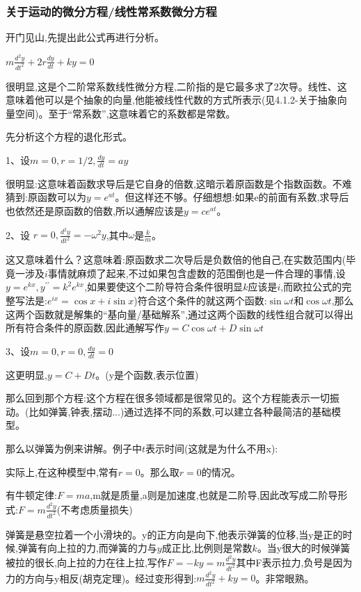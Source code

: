 \documentclass[UTF8]{ctexbook}
\newcommand{\doubleDerivative}{^{\prime\prime}}
\begin{document}
{{{{}%

\subsubsection{关于运动的微分方程/线性常系数微分方程}{
开门见山,先提出此公式再进行分析。

$m\frac{d^2y}{dt^2} + 2r\frac{dy}{dt} + ky = 0$

很明显,这是个二阶常系数线性微分方程,二阶指的是它最多求了2次导。线性、这意味着他可以是个抽象的向量,他能被线性代数的方式所表示(见4.1.2-关于抽象向量空间)。至于“常系数”,这意味着它的系数都是常数。

先分析这个方程的退化形式。

1、设$m = 0, r = 1/2, \frac{dy}{dt} = ay$

很明显:这意味着函数求导后是它自身的倍数,这暗示着原函数是个指数函数。不难猜到:原函数可以为$y = e^{at}$。但这样还不够。仔细想想:如果e的前面有系数,求导后也依然还是原函数的倍数,所以通解应该是$y = ce^{at}$。

2、设 $r = 0, \frac{d^2y}{dt^2} = -\omega^2y$,其中$\omega$是$\frac{k}{m}$。

这又意味着什么？这意味着:原函数求二次导后是负数倍的他自己,在实数范围内(毕竟一涉及$i$事情就麻烦了起来,不过如果包含虚数的范围倒也是一件合理的事情,设$y=e^{kx},y\doubleDerivative = k^{2}e^{kx}$,如果要使这个二阶导符合条件很明显$k$应该是$i$,而欧拉公式的完整写法是:$e^{ix} = \cos x + i\sin x$)符合这个条件的就这两个函数:$\sin\omega t$和$\cos\omega t$,那么这两个函数就是解集的“基向量/基础解系”,通过这两个函数的线性组合就可以得出所有符合条件的原函数,因此通解写作$y = C\cos\omega t + D\sin\omega t$

3、设$m = 0, r = 0, \frac{dy}{dt} = 0$

这更明显,$y = C + Dt$。(y是个函数,表示位置)

那么回到那个方程:这个方程在很多领域都是很常见的。这个方程能表示一切振动。(比如弹簧,钟表,摆动...)通过选择不同的系数,可以建立各种最简洁的基础模型。

那么以弹簧为例来讲解。例子中$t$表示时间(这就是为什么不用x):

实际上,在这种模型中,常有$r = 0$。那么取$ r = 0$的情况。

有牛顿定律:$F = ma$,m就是质量,a则是加速度,也就是二阶导,因此改写成二阶导形式:$F = m\frac{d^2y}{dt^2}$(不考虑质量损失)

弹簧是悬空拉着一个小滑块的。y的正方向是向下,他表示弹簧的位移,当y是正的时候,弹簧有向上拉的力,而弹簧的力与$y$成正比,比例则是常数$k$。当y很大的时候弹簧被拉的很长,向上拉的力在往上拉,写作$F = -ky = m\frac{d^2y}{dt^2}$其中F表示拉力,负号是因为力的方向与y相反(胡克定理)。经过变形得到:$m\frac{d^2y}{dt^2} + ky = 0$。非常眼熟。

}}}}
\end{document}
